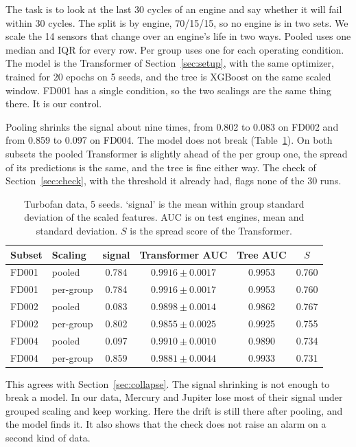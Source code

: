 \documentclass{IEEEtaes}
\begin{document}
The task is to look at the last 30 cycles of an engine and say whether it will fail within 30 cycles. The split is by engine, 70/15/15, so no engine is in two sets. We scale the 14 sensors that change over an engine's life in two ways. Pooled uses one median and IQR for every row. Per group uses one for each operating condition. The model is the Transformer of Section~\ref{sec:setup}, with the same optimizer, trained for 20 epochs on 5 seeds, and the tree is XGBoost on the same scaled window. FD001 has a single condition, so the two scalings are the same thing there. It is our control.

Pooling shrinks the signal about nine times, from 0.802 to 0.083 on FD002 and from 0.859 to 0.097 on FD004. The model does not break (Table~\ref{tab:cmapss}). On both subsets the pooled Transformer is slightly ahead of the per group one, the spread of its predictions is the same, and the tree is fine either way. The check of Section~\ref{sec:check}, with the threshold it already had, flags none of the 30 runs.

\begin{table}[t]
\centering
\caption{Turbofan data, 5 seeds. `signal' is the mean within group standard deviation of the scaled features. AUC is on test engines, mean and standard deviation. $S$ is the spread score of the Transformer.}
\label{tab:cmapss}
\footnotesize
\setlength{\tabcolsep}{4pt}
\begin{tabular}{@{}llcccc@{}}
\toprule
Subset & Scaling & signal & Transformer AUC & Tree AUC & $S$ \\
\midrule
FD001 & pooled & 0.784 & $0.9916 \pm 0.0017$ & 0.9953 & 0.760 \\
FD001 & per-group & 0.784 & $0.9916 \pm 0.0017$ & 0.9953 & 0.760 \\
FD002 & pooled & 0.083 & $0.9898 \pm 0.0014$ & 0.9862 & 0.767 \\
FD002 & per-group & 0.802 & $0.9855 \pm 0.0025$ & 0.9925 & 0.755 \\
FD004 & pooled & 0.097 & $0.9910 \pm 0.0010$ & 0.9890 & 0.734 \\
FD004 & per-group & 0.859 & $0.9881 \pm 0.0044$ & 0.9933 & 0.731 \\
\bottomrule
\end{tabular}
\end{table}

This agrees with Section~\ref{sec:collapse}. The signal shrinking is not enough to break a model. In our data, Mercury and Jupiter lose most of their signal under grouped scaling and keep working. Here the drift is still there after pooling, and the model finds it. It also shows that the check does not raise an alarm on a second kind of data.
\end{document}
